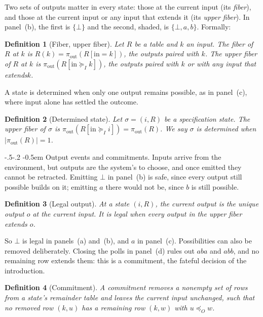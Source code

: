 \documentclass[sigconf]{cidr-2027}
\makeatletter
\newtheorem{definition}{Definition}
\theoremstyle{remark}
\renewcommand\paragraph{\@startsection{paragraph}{4}{\z@}%
  {-.5\baselineskip \@plus -2\p@ \@minus -.2\p@}%
  {-0.5em}%
  {\normalfont\bfseries}}
\newcommand{\OutputOrd}{\preceq_O}
\newcommand{\InputGe}{\succeq_I}
\newcommand{\commitment}{commitment\xspace}
\newcommand{\commitments}{commitments\xspace}
\newcommand{\Commitment}{Commitment\xspace}
\newcommand{\inrel}{extends\xspace}          %
\newcommand{\outrel}{extends\xspace}          %
\makeatother
\begin{document}
Two sets of outputs matter in every state: those at the current
input (its \emph{fiber}), and those at the current input or any input that
\inrel it (its \emph{upper fiber}).  In panel~(b), the
first is $\{\bot\}$ and the second, shaded, is $\{\bot,a,b\}$. Formally:

\begin{definition}[Fiber, upper fiber]
\label{def:fiber}
Let $R$ be a table and $k$ an input.  The \emph{fiber} of $R$ at $k$ is
$R(k)=\pi_{\mathrm{out}}(R[\mathrm{in}=k])$, the outputs paired with $k$.  The
\emph{upper fiber} of $R$ at $k$ is $\pi_{\mathrm{out}}(R[\mathrm{in}\InputGe
k])$, the outputs paired with $k$ or with any input that \inrel $k$.
\end{definition}

A state is determined when only one output remains possible, as in panel~(c),
where input alone has settled the outcome.

\begin{definition}[Determined state]
\label{def:determined}
Let $\sigma = (i, R)$ be a specification state.  The upper fiber of $\sigma$
is $\pi_{\mathrm{out}}(R[\mathrm{in}\InputGe i]) = \pi_{\mathrm{out}}(R)$.
We say $\sigma$ is \emph{determined} when $|\pi_{\mathrm{out}}(R)|=1$.
\end{definition}

\paragraph{Output events and \commitments.}
Inputs arrive from the environment, but outputs are the system's to choose, and
once emitted they cannot be retracted.  Emitting $\bot$ in panel~(b) is safe,
since every output still possible builds on it; emitting $a$ there would not
be, since $b$ is still possible.

\begin{definition}[Legal output]
\label{def:exposable}
At a state $(i,R)$, the \emph{current output} is the unique output $o$ at the
current input.  It is \emph{legal} when every output in the upper fiber \outrel
$o$.
\end{definition}

So $\bot$ is legal in panels~(a) and~(b), and $a$ in panel~(c).  Possibilities
can also be removed deliberately.  Closing the polls in panel~(d) rules out
$aba$ and $abb$, and no remaining row \outrel them: this is a \commitment, the
fateful decision of the introduction.

\begin{definition}[\Commitment]
\label{def:commitment}
A \emph{\commitment} removes a nonempty set of rows from a state's remainder
table and leaves the current input unchanged, such that no removed row $(k,u)$
has a remaining row $(k,w)$ with $u\OutputOrd w$.
\end{definition}
\end{document}
